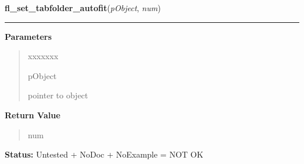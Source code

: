 \hspace{.8\funcindent}\begin{boxedminipage}{\funcwidth}

    \raggedright \textbf{fl\_set\_tabfolder\_autofit}(\textit{pObject}, \textit{num})

    \vspace{-1.5ex}

    \rule{\textwidth}{0.5\fboxrule}
\setlength{\parskip}{2ex}
\setlength{\parskip}{1ex}
      \textbf{Parameters}
      \vspace{-1ex}

      \begin{quote}
        \begin{Ventry}{xxxxxxx}

          \item[pObject]

          pointer to object

        \end{Ventry}

      \end{quote}

      \textbf{Return Value}
    \vspace{-1ex}

      \begin{quote}
      num

      \end{quote}

\textbf{Status:} Untested + NoDoc + NoExample = NOT OK



    \end{boxedminipage}

    \label{xformslib:library:fl_set_default_tabfolder_corner}

    \vspace{0.5ex}


